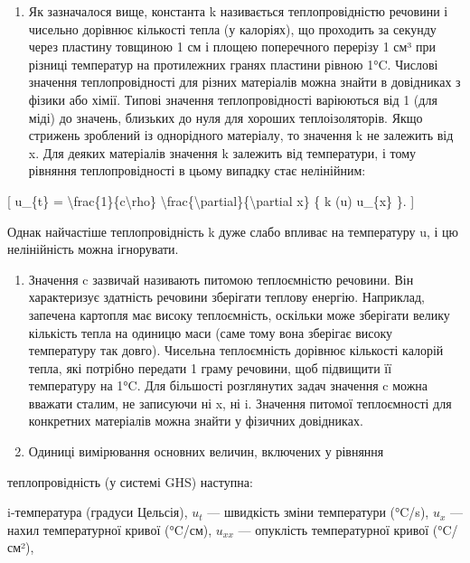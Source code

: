 \documentclass[
]{article}
\providecommand{\tightlist}{%
  \setlength{\itemsep}{0pt}\setlength{\parskip}{0pt}}
\begin{document}
\begin{enumerate}
\def\labelenumi{\arabic{enumi}.}
\tightlist
\item
  Як зазначалося вище, константа k називається теплопровідністю речовини
  і чисельно дорівнює кількості тепла (у калоріях), що проходить за
  секунду через пластину товщиною 1 см і площею поперечного перерізу 1
  см³ при різниці температур на протилежних гранях пластини рівною 1°C.
  Числові значення теплопровідності для різних матеріалів можна знайти в
  довідниках з фізики або хімії. Типові значення теплопровідності
  варіюються від 1 (для міді) до значень, близьких до нуля для хороших
  теплоізоляторів. Якщо стрижень зроблений із однорідного матеріалу, то
  значення k не залежить від x. Для деяких матеріалів значення k
  залежить від температури, і тому рівняння теплопровідності в цьому
  випадку стає нелінійним:
\end{enumerate}

{[} u\_\{t\} = \textbackslash frac\{1\}\{c\textbackslash rho\}
\textbackslash frac\{\textbackslash partial\}\{\textbackslash partial
x\} \{ k (u) \textbar{} u\_\{x\} \}. {]}

Однак найчастіше теплопровідність k дуже слабо впливає на температуру u,
і цю нелінійність можна ігнорувати.

\begin{enumerate}
\def\labelenumi{\arabic{enumi}.}
\setcounter{enumi}{1}
\item
  Значення c зазвичай називають питомою теплоємністю речовини. Він
  характеризує здатність речовини зберігати теплову енергію. Наприклад,
  запечена картопля має високу теплоємність, оскільки може зберігати
  велику кількість тепла на одиницю маси (саме тому вона зберігає високу
  температуру так довго). Чисельна теплоємність дорівнює кількості
  калорій тепла, які потрібно передати 1 граму речовини, щоб підвищити
  її температуру на 1°C. Для більшості розглянутих задач значення c
  можна вважати сталим, не записуючи ні x, ні i. Значення питомої
  теплоємності для конкретних матеріалів можна знайти у фізичних
  довідниках.
\item
  Одиниці вимірювання основних величин, включених у рівняння
\end{enumerate}

теплопровідність (у системі GHS) наступна:

i-температура (градуси Цельсія), \(u_t\) --- швидкість зміни температури
(°C/s), \(u_x\) --- нахил температурної кривої (°C/см), \(u_{xx}\) ---
опуклість температурної кривої (°C/см²),
\end{document}
